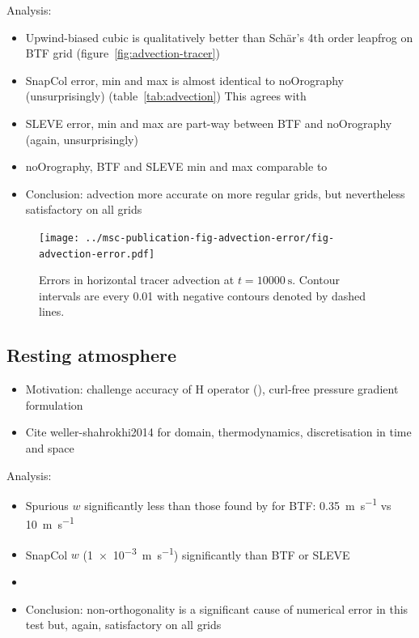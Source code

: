 \documentclass[twocol]{ametsoc}
\begin{document}
Analysis:
\begin{itemize}
	\item Upwind-biased cubic is qualitatively better than Sch\"ar's 4th order leapfrog on BTF grid (figure~\ref{fig:advection-tracer})
	\item SnapCol error, min and max is almost identical to noOrography (unsurprisingly) (table~\ref{tab:advection})  This agrees with \citet{good2014}
	\item SLEVE error, min and max are part-way between BTF and noOrography (again, unsurprisingly)
	\item noOrography, BTF and SLEVE min and max comparable to \citet{schaer2002}
	\item Conclusion: advection more accurate on more regular grids, but nevertheless satisfactory on all grids
\end{itemize}


\begin{figure}
	\centering
	\texttt{[image: ../msc-publication-fig-advection-error/fig-advection-error.pdf]}
	\caption{Errors in horizontal tracer advection at $t = \SI{10000}{\second}$.    Contour intervals are every 0.01 with negative contours denoted by dashed lines.}
	\label{fig:advection-error}
\end{figure}


\subsection{Resting atmosphere}

\begin{itemize}
	\item Motivation: challenge accuracy of H operator (), curl-free pressure gradient formulation
	\item Cite weller-shahrokhi2014 for domain, thermodynamics, discretisation in time and space
\end{itemize}

Analysis:
\begin{itemize}
	\item Spurious $w$ significantly less than those found by \citet{klemp2011} for BTF: \SI{0.35}{\meter\per\second} vs \SI{10}{\meter\per\second}
	\item SnapCol $w$ (\SI{1e-3}{\meter\per\second}) significantly than BTF or SLEVE
	\item {}
	\item Conclusion: non-orthogonality is a significant cause of numerical error in this test but, again, satisfactory on all grids
\end{itemize}
\end{document}
